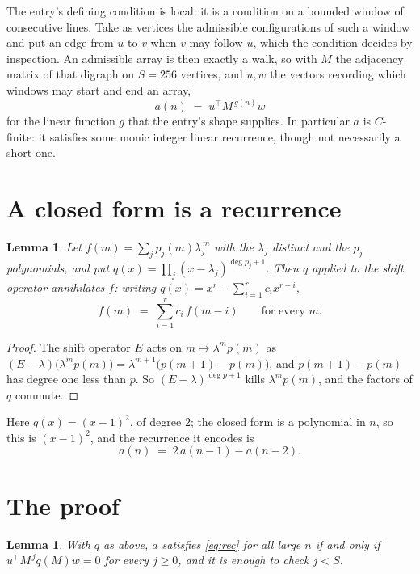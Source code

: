 \documentclass[11pt,a4paper]{article}
\theoremstyle{plain}
\newtheorem{lemma}[theorem]{Lemma}
\theoremstyle{definition}
\begin{document}
The entry's defining condition is local: it is a condition on a bounded window of consecutive lines. Take as vertices the
admissible configurations of such a window and put an edge from $u$ to $v$ when $v$ may
follow $u$, which the condition decides by inspection. An admissible array is then exactly a
walk, so with $M$ the adjacency matrix of that digraph on $S=256$ vertices, and $u,w$ the
vectors recording which windows may start and end an array,
\[
a(n)\;=\;u^{\!\top}M^{\,g(n)}w
\]
for the linear function $g$ that the entry's shape supplies. In particular $a$ is
$C$-finite: it satisfies some monic integer linear recurrence, though not necessarily a short
one.

\section{A closed form is a recurrence}

\begin{lemma}\label{lem:ann}
Let $f(m)=\sum_{j}p_j(m)\lambda_j^{\,m}$ with the $\lambda_j$ distinct and the $p_j$
polynomials, and put $q(x)=\prod_j(x-\lambda_j)^{\deg p_j+1}$. Then $q$ applied to the shift
operator annihilates $f$: writing $q(x)=x^{r}-\sum_{i=1}^{r}c_ix^{r-i}$,
\[
f(m)\;=\;\sum_{i=1}^{r}c_i\,f(m-i)\qquad\text{for every }m.
\]
\end{lemma}

\begin{proof}
The shift operator $E$ acts on $m\mapsto\lambda^{m}p(m)$ as
$(E-\lambda)\bigl(\lambda^{m}p(m)\bigr)=\lambda^{m+1}\bigl(p(m+1)-p(m)\bigr)$, and
$p(m+1)-p(m)$ has degree one less than $p$. So $(E-\lambda)^{\deg p+1}$ kills
$\lambda^{m}p(m)$, and the factors of $q$ commute.
\end{proof}

Here $q(x)=(x-1)^{2}$, of degree $2$; the closed form is a polynomial in $n$, so this is $(x-1)^{2}$, and the recurrence it encodes is
\begin{equation}\label{eq:rec}
a(n)\;=\;2\,a(n-1) - a(n-2).
\end{equation}

\section{The proof}

\begin{lemma}\label{lem:crit}
With $q$ as above, $a$ satisfies \eqref{eq:rec} for all large $n$ if and only if
$u^{\!\top}M^{\,j}q(M)w=0$ for every $j\ge0$, and it is enough to check $j<S$.
\end{lemma}
\end{document}
